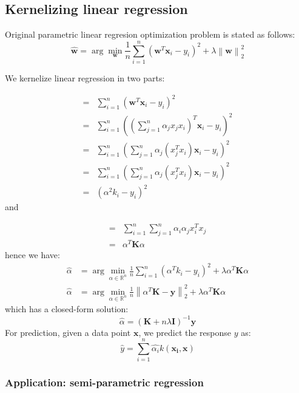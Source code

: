 \documentclass[a4paper,10pt,twoside]{article}
\newcommand\norm[1]{\left\lVert#1\right\rVert}
\begin{document}
\subsection{Kernelizing linear regression}

Original parametric linear regresion optimization problem is stated as follows:
\begin{equation*}
    \hat{\mathbf{w}}=\arg\min_{\mathbf{w}}\frac{1}{n}\sum_{i=1}^{n}(\mathbf{w}^T\mathbf{x}_i-y_i)^2+\lambda\norm{\mathbf{w}}_2^2
\end{equation*}

We kernelize linear regression in two parts:

\begin{align*}
    =& \sum_{i=1}^{n}(\mathbf{w}^T\mathbf{x}_i-y_i)^2\\
    =& \sum_{i=1}^{n}((\sum_{j=1}^{n}\alpha_jx_jx_i)^T\mathbf{x}_i-y_i)^2\\
    =& \sum_{i=1}^{n}(\sum_{j=1}^{n}\alpha_j(x_j^Tx_i)\mathbf{x}_i-y_i)^2\\
    =& \sum_{i=1}^{n}(\sum_{j=1}^{n}\alpha_j(x_j^Tx_i)\mathbf{x}_i-y_i)^2\\
    =& (\alpha^2k_i-y_i)^2
\end{align*}
and

\begin{align*}
    =& \sum_{i=1}^{n}\sum_{j=1}^{n}\alpha_i\alpha_jx_i^Tx_j\\
    =& \alpha^T\mathbf{K}\alpha
\end{align*}
hence we have:
\begin{align*}
    \hat{\alpha}&=\arg\min_{\alpha\in\mathbb{R}^{n}}\frac{1}{n}\sum_{i=1}^{n}(\alpha^Tk_i-y_i)^2+\lambda\alpha^T\mathbf{K}\alpha\\
    \hat{\alpha}&=\arg\min_{\alpha\in\mathbb{R}^{n}}\frac{1}{n}\norm{\alpha^T\mathbf{K}-\mathbf{y}}_2^2+\lambda\alpha^T\mathbf{K}\alpha
\end{align*}
which has a closed-form solution:
\begin{equation*}
    \hat{\alpha}=(\mathbf{K}+n\lambda \mathbf{I})^{-1}\mathbf{y}
\end{equation*}
For prediction, given a data point $\mathbf{x}$, we predict the response $y$ as:
\begin{equation*}
    \hat{y}=\sum_{i=1}^{n}\hat{\alpha_i}k(\mathbf{x_i},\mathbf{x})
\end{equation*}

\subsubsection{Application: semi-parametric regression}
\end{document}
